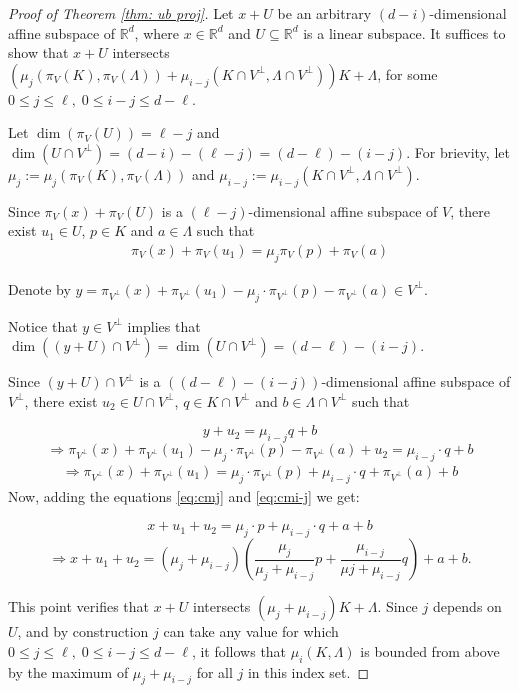 \documentclass[10pt,a4paper]{amsart}
\newcommand{\R}{\mathbb{R}}
\begin{document}
\begin{proof}[Proof of Theorem \ref{thm: ub proj}]
Let $x+U$ be an arbitrary $(d-i)$-dimensional affine subspace of $\R^d$, where $x\in \R^d$ and $U\subseteq \R^d$ is a linear subspace. It suffices to show that $x+U$ intersects $(\mu_j(\pi_V(K), \pi_V(\Lambda))+ \mu_{i-j}(K\cap V^\perp, \Lambda \cap V^\perp))K + \Lambda $, for some $0 \le j \le \ell,\; 0 \le i-j \le d-\ell$.

Let $\dim(\pi_V(U))=\ell-j$ and $\dim(U\cap V^\perp)=(d-i)-(\ell-j)=(d-\ell)-(i-j)$. For brievity, let $\mu_j:=\mu_j(\pi_V(K),\pi_V(\Lambda))$ and $\mu_{i-j}:=\mu_{i-j}(K\cap V^\perp, \Lambda \cap V^\perp)$.

Since $\pi_V(x)+\pi_V(U)$ is a $(\ell-j)$-dimensional affine subspace of $V$, there exist $u_1\in U$, $p\in K$ and $a\in \Lambda$ such that 
\begin{align}\label{eq:cmj}
\pi_V(x)+\pi_V(u_1)=\mu_j \pi_V(p)+\pi_V(a)
\end{align}

Denote by $y=\pi_{V^\perp}(x)+\pi_{V^\perp}(u_1)-\mu_j\cdot \pi_{V^\perp}(p)-\pi_{V^\perp}(a)\in V^\perp$.


\noindent Notice that $y\in V^\perp$ implies that $\dim((y+U)\cap V^\perp)=\dim(U\cap V^\perp)=(d-\ell)-(i-j)$. 

\noindent Since $(y+U)\cap V^\perp$ is a $((d-\ell)-(i-j))$-dimensional affine subspace of $V^\perp$, there exist $u_2 \in U\cap V^\perp$, $q\in K\cap V^\perp$ and $b\in \Lambda \cap V^\perp$ such that

$$y+u_2=\mu_{i-j}q+b$$
$$\Rightarrow \pi_{V^\perp}(x)+\pi_{V^\perp}(u_1)-\mu_j\cdot \pi_{V^\perp}(p)-\pi_{V^\perp}(a)+u_2=\mu_{i-j}\cdot q+b$$
\begin{align}\label{eq:cmi-j}
\Rightarrow \pi_{V^\perp}(x)+\pi_{V^\perp}(u_1)=\mu_j\cdot \pi_{V^\perp}(p)+\mu_{i-j}\cdot q+\pi_{V^\perp}(a)+b
\end{align}
Now, adding the equations \ref{eq:cmj} and \ref{eq:cmi-j} we get:

$$ x+u_1+u_2=\mu_j\cdot p+\mu_{i-j}\cdot q+a+b$$
$$\Rightarrow x+u_1+u_2=(\mu_j+\mu_{i-j})\left(\frac{\mu_j}{\mu_j+\mu_{i-j}}p+\frac{\mu_{i-j}}{\mu{j}+\mu_{i-j}}q\right)+a+b.$$

This point verifies that $x+U$ intersects $(\mu_j+\mu_{i-j})K + \Lambda$. Since $j$ depends on $U$, and by construction $j$ can take any value for which $0 \le j \le \ell,\; 0 \le i-j \le d-\ell$, it follows that $\mu_i(K,\Lambda)$ is bounded from above by the maximum of $\mu_j+\mu_{i-j}$ for all $j$ in this index set. \end{proof}
\end{document}
